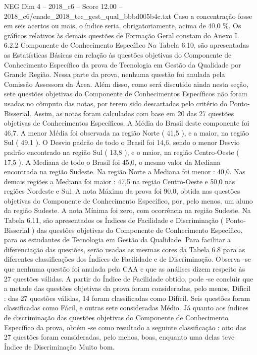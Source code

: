 \begin{textsample}{NEG Dim 4 – 2018\_c6 – Score 12.00 – 2018\_c6/enade\_2018\_tec\_gest\_qual\_bbbd005b4c.txt}
Caso a concentração fosse em seis acertos ou mais, o índice seria, obrigatoriamente, acima de 40,0 \%.
Os gráficos relativos às demais questões de Formação Geral constam do Anexo I. 6.2.2 Componente de Conhecimento Específico Na Tabela 6.10, são apresentadas as Estatísticas Básicas em relação às questões objetivas do Componente de Conhecimento Específico da prova de Tecnologia em Gestão da Qualidade por Grande Região.
Nessa parte da prova, nenhuma questão foi anulada pela Comissão Assessora da Área.
Além disso, como será discutido ainda nesta seção, sete questões objetivas do Componente de Conhecimentos Específicos não foram usadas no cômputo das notas, por terem sido descartadas pelo critério do Ponto-Bisserial.
Assim, as notas foram calculadas com base em 20 das 27 questões objetivas de Conhecimentos Específicos.
A Média do Brasil deste componente foi 46,7.
A menor Média foi observada na região Norte ( 41,5 ), e a maior, na região Sul ( 49,1 ).
O Desvio padrão de todo o Brasil foi 14,6, sendo o menor Desvio padrão encontrado na região Sul ( 13,8 ), e o maior, na região Centro-Oeste ( 17,5 ).
A Mediana de todo o Brasil foi 45,0, o mesmo valor da Mediana encontrada na região Sudeste.
Na região Norte a Mediana foi menor : 40,0.
Nas demais regiões a Mediana foi maior : 47,5 na região Centro-Oeste e 50,0 nas regiões Nordeste e Sul.
A nota Máxima da prova foi 90,0, obtida nas questões objetivas do Componente de Conhecimento Específico, por, pelo menos, um aluno da região Sudeste.
A nota Mínima foi zero, com ocorrência na região Sudeste.
Na Tabela 6.11, são apresentados os Índices de Facilidade e Discriminação ( Ponto-Bisserial ) das questões objetivas do Componente de Conhecimento Específico, para os estudantes de Tecnologia em Gestão da Qualidade.
Para facilitar a diferenciação das questões, serão usadas as mesmas cores da Tabela 6.8 para as diferentes classificações dos Índices de Facilidade e de Discriminação.
Observa -se que nenhuma questão foi anulada pela CAA e que as análises dizem respeito às 27 questões válidas.
A partir do Índice de Facilidade obtido, pode -se concluir que a metade das questões objetivas da prova foram consideradas, pelo menos, Difícil : das 27 questões válidas, 14 foram classificadas como Difícil.
Seis questões foram classificadas como Fácil, e outras sete consideradas Médio.
Já quanto aos índices de discriminação das questões objetivas do Componente de Conhecimento Específico da prova, obtém -se como resultado a seguinte classificação : oito das 27 questões foram consideradas, pelo menos, boas, enquanto uma delas teve Índice de Discriminação Muito bom.

\end{textsample}
